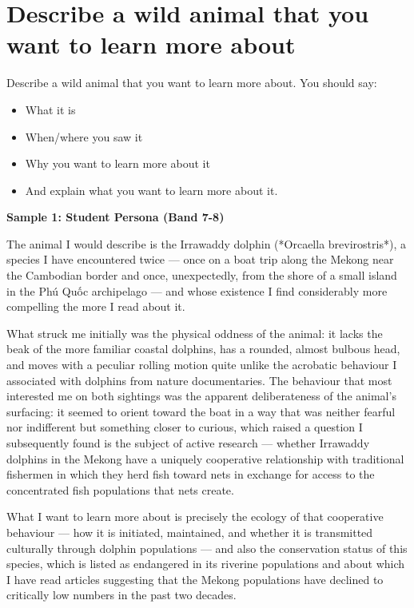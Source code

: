 \section{Describe a wild animal that you want to learn more about}
\begin{ieltsprompt}
Describe a wild animal that you want to learn more about.
You should say:
\begin{itemize}[leftmargin=2em, itemsep=2pt]
\item What it is
\item When/where you saw it
\item Why you want to learn more about it
\item And explain what you want to learn more about it.
\end{itemize}
\end{ieltsprompt}
\begin{ieltsanswer}
\textbf{Sample 1: Student Persona (Band 7-8)}

The animal I would describe is the Irrawaddy dolphin (*Orcaella brevirostris*), a species I have encountered twice — once on a boat trip along the Mekong near the Cambodian border and once, unexpectedly, from the shore of a small island in the Phú Quốc archipelago — and whose existence I find considerably more compelling the more I read about it.

What struck me initially was the physical oddness of the animal: it lacks the beak of the more familiar coastal dolphins, has a rounded, almost bulbous head, and moves with a peculiar rolling motion quite unlike the acrobatic behaviour I associated with dolphins from nature documentaries. The behaviour that most interested me on both sightings was the apparent deliberateness of the animal's surfacing: it seemed to orient toward the boat in a way that was neither fearful nor indifferent but something closer to curious, which raised a question I subsequently found is the subject of active research — whether Irrawaddy dolphins in the Mekong have a uniquely cooperative relationship with traditional fishermen in which they herd fish toward nets in exchange for access to the concentrated fish populations that nets create.

What I want to learn more about is precisely the ecology of that cooperative behaviour — how it is initiated, maintained, and whether it is transmitted culturally through dolphin populations — and also the conservation status of this species, which is listed as endangered in its riverine populations and about which I have read articles suggesting that the Mekong populations have declined to critically low numbers in the past two decades.


\end{ieltsanswer}
